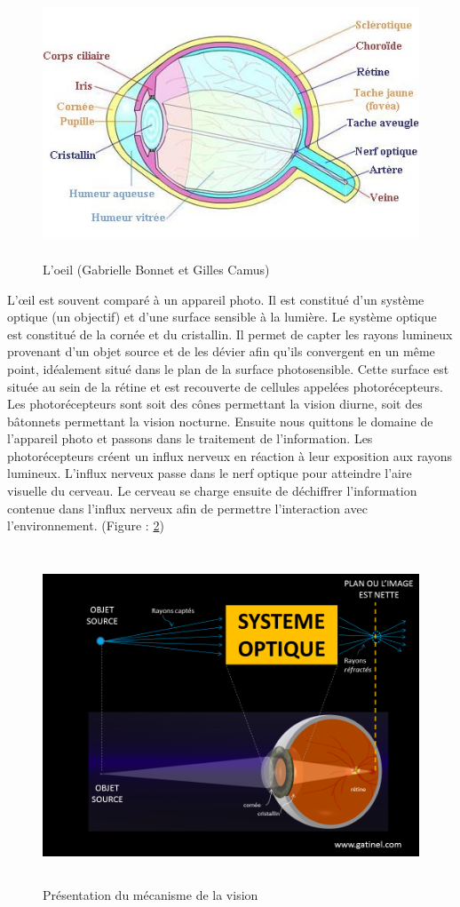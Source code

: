 \documentclass[a4paper,12pt]{article}
\begin{document}
\begin{figure}[h]
	\centering
	\includegraphics[height=8cm]{oeil.jpg} 
	\caption{L'oeil (Gabrielle Bonnet et Gilles Camus)}
	\label{oeil}
\end{figure}

L’œil est souvent comparé à un appareil photo. Il est constitué d'un système optique (un objectif) et d'une surface sensible à la lumière. Le système optique est constitué de la cornée et du cristallin. Il permet de capter les rayons lumineux provenant d'un objet source et de les dévier afin qu'ils convergent en un même point, idéalement situé dans le plan de la surface photosensible. Cette surface est située au sein de la rétine et est recouverte de cellules appelées photorécepteurs. Les photorécepteurs sont soit des cônes permettant la vision diurne, soit des bâtonnets permettant la vision nocturne. Ensuite nous quittons le domaine de l'appareil photo et passons dans le traitement de l'information. Les photorécepteurs créent un influx nerveux en réaction à leur exposition aux rayons lumineux. L'influx nerveux passe dans le nerf optique pour atteindre l'aire visuelle du cerveau. Le cerveau se charge ensuite de déchiffrer l'information contenue dans l'influx nerveux afin de permettre l'interaction avec l'environnement. (Figure : \ref{fig:Vision})

\begin{figure}[h]
	\centering
	\includegraphics[height=10cm]{oeil.png} 
	\caption{Présentation du mécanisme de la vision}
	\label{fig:Vision}
\end{figure}
\end{document}
